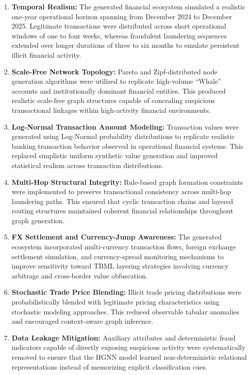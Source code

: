 \documentclass[conference]{IEEEtran}
\begin{document}
\begin{enumerate}
\item \textbf{Temporal Realism:}
The generated financial ecosystem simulated a realistic one-year operational horizon spanning from December 2024 to December 2025. Legitimate transactions were distributed across short operational windows of one to four weeks, whereas fraudulent laundering sequences extended over longer durations of three to six months to emulate persistent illicit financial activity.

\item \textbf{Scale-Free Network Topology:}
Pareto and Zipf-distributed node generation algorithms were utilized to replicate high-volume ``Whale'' accounts and institutionally dominant financial entities. This produced realistic scale-free graph structures capable of concealing suspicious transactional linkages within high-activity financial environments.

\item \textbf{Log-Normal Transaction Amount Modeling:}
Transaction values were generated using Log-Normal probability distributions to replicate realistic banking transaction behavior observed in operational financial systems. This replaced simplistic uniform synthetic value generation and improved statistical realism across transaction distributions.

\item \textbf{Multi-Hop Structural Integrity:}
Rule-based graph formation constraints were implemented to preserve transactional consistency across multi-hop laundering paths. This ensured that cyclic transaction chains and layered routing structures maintained coherent financial relationships throughout graph generation.

\item \textbf{FX Settlement and Currency-Jump Awareness:}
The generated ecosystem incorporated multi-currency transaction flows, foreign exchange settlement simulation, and currency-spread monitoring mechanisms to improve sensitivity toward TBML layering strategies involving currency arbitrage and cross-border value obfuscation.

\item \textbf{Stochastic Trade Price Blending:}
Illicit trade pricing distributions were probabilistically blended with legitimate pricing characteristics using stochastic modeling approaches. This reduced observable tabular anomalies and encouraged context-aware graph inference.

\item \textbf{Data Leakage Mitigation:}
Auxiliary attributes and deterministic fraud indicators capable of directly exposing suspicious activity were systematically removed to ensure that the HGNN model learned non-deterministic relational representations instead of memorizing explicit classification cues.


\end{enumerate}
\end{document}
